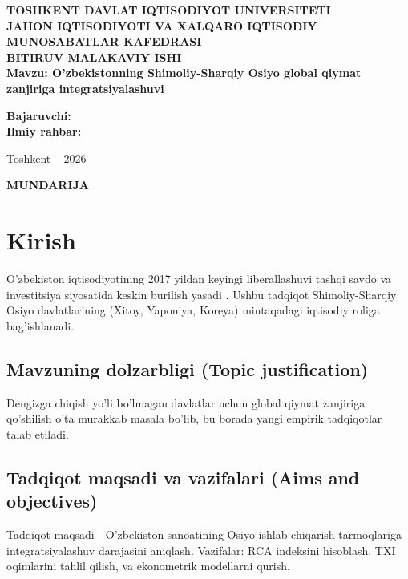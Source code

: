 \documentclass[14pt,a4paper]{extarticle}
\begin{document}
\begin{titlepage}
    \centering
    \vspace*{2cm}
    {\large \textbf{TOSHKENT DAVLAT IQTISODIYOT UNIVERSITETI}}\\[1cm]
    {\large \textbf{JAHON IQTISODIYOTI VA XALQARO IQTISODIY MUNOSABATLAR KAFEDRASI}}\\[3cm]
    
    {\Large \textbf{BITIRUV MALAKAVIY ISHI}}\\[2cm]
    
    {\large \textbf{Mavzu: O'zbekistonning Shimoliy-Sharqiy Osiyo global qiymat zanjiriga integratsiyalashuvi}}\\[3cm]
    
    \vfill
    \begin{flushright}
        \textbf{Bajaruvchi:} \underline{\hspace{4cm}} \\
        \textbf{Ilmiy rahbar:} \underline{\hspace{4cm}}
    \end{flushright}
    \vspace{2cm}
    {\large Toshkent -- 2026}
\end{titlepage}

\newpage




\newpage
\begin{center}
    \textbf{\MakeUppercase{Mundarija}}
\end{center}
\tableofcontents
\newpage

\section{Kirish}
O'zbekiston iqtisodiyotining 2017 yildan keyingi liberallashuvi tashqi savdo va investitsiya siyosatida keskin burilish yasadi \citep{world_bank_wdi}. Ushbu tadqiqot Shimoliy-Sharqiy Osiyo davlatlarining (Xitoy, Yaponiya, Koreya) mintaqadagi iqtisodiy roliga bag'ishlanadi.

\subsection{Mavzuning dolzarbligi (Topic justification)}
Dengizga chiqish yo'li bo'lmagan davlatlar uchun global qiymat zanjiriga qo'shilish o'ta murakkab masala bo'lib, bu borada yangi empirik tadqiqotlar talab etiladi.

\subsection{Tadqiqot maqsadi va vazifalari (Aims and objectives)}
Tadqiqot maqsadi - O'zbekiston sanoatining Osiyo ishlab chiqarish tarmoqlariga integratsiyalashuv darajasini aniqlash. Vazifalar: RCA indeksini hisoblash, TXI oqimlarini tahlil qilish, va ekonometrik modellarni qurish.
\end{document}
